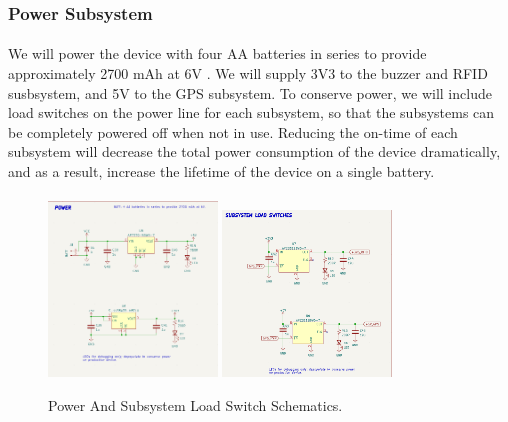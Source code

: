 \documentclass{article}
\begin{document}
\subsubsection{Power Subsystem} 
\paragraph{}
We will power the device with four AA batteries in series to provide approximately 2700 mAh at 6V \cite{battery}. We will supply 3V3 to the buzzer and RFID susbsystem, and 5V to the GPS subsystem. To conserve power, we will include load switches on the power line for each subsystem, so that the subsystems can be completely powered off when not in use. Reducing the on-time of each subsystem will decrease the total power consumption of the device dramatically, and as a result, increase the lifetime of the device on a single battery. 
\paragraph{} 

\begin{center}
	\begin{figure}[H]
		\centering
		\includegraphics[width= 0.4\textwidth]{pwr_sch.png}
		\includegraphics[width= 0.4\textwidth]{loadsw_sch.png}
		\caption{Power And Subsystem Load Switch Schematics.} \label{pwr_sch}
	\end{figure}
\end{center}
\end{document}

